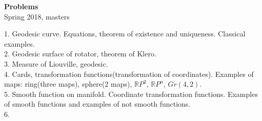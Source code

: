 \documentclass[12pt]{article}
\begin{document}
    \begin{center}
        \textbf{Problems}\\
        Spring 2018, masters
    \end{center}
    1. Geodesic curve. Equations, theorem of existence and uniqueness. Classical examples. \\
    2. Geodesic surface of rotator, theorem of Klero. \\
    3. Measure of Liouville, geodesic. \\
    4. Cards, transformation functions(transformation of coordinates). Examples of maps: ring(three maps), sphere(2 maps), $\mathbb{R}P^2$, $\mathbb{R}P^n$, $Gr(4,2)$.\\
    5. Smooth function on manifold. Coordinate transformation functions. Examples of smooth functions and examples of not smooth functions. \\
    6. 
\end{document}
